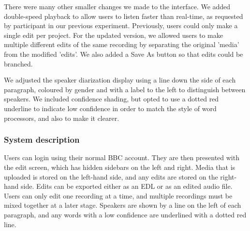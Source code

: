 There were many other smaller changes we made to the interface. We added double-speed playback to allow users to listen
faster than real-time, as requested by participant in our previous experiment. Previously, users could only make a
single edit per project. For the updated version, we allowed users to make multiple different edits of the same
recording by separating the original 'media' from the modified 'edits'. We also added a Save As button so that edits
could be branched.

We adjusted the speaker diarization display using a line down the side of each paragraph, coloured by gender and with a
label to the left to distinguish between speakers. We included confidence shading, but opted to use a dotted red
underline to indicate low confidence in order to match the style of word processors, and also to make it clearer.

\subsubsection{System description}

Users can login using their normal BBC account. They are then presented with the edit screen, which
has hidden sidebars on the left and right. Media that is uploaded is stored on the left-hand side, and any edits are
stored on the right-hand side. Edits can be exported either as an EDL or as an edited audio file. Users can only edit
one recording at a time, and multiple recordings must be mixed together at a later stage. Speakers are shown by a line
on the left of each paragraph, and any words with a low confidence are underlined with a dotted red line.

